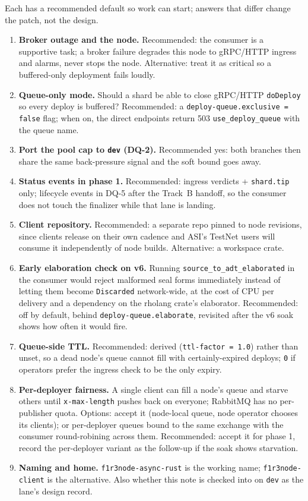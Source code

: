 \documentclass[11pt]{article}
\newcommand{\code}[1]{\texttt{#1}}
\newcommand{\dev}{\code{dev}}
\begin{document}
Each has a recommended default so work can start; answers that differ change the
patch, not the design.
\begin{enumerate}[leftmargin=2em]
  \item \textbf{Broker outage and the node.} Recommended: the consumer is a
    supportive task; a broker failure degrades this node to gRPC/HTTP ingress and
    alarms, never stops the node. Alternative: treat it as critical so a
    buffered-only deployment fails loudly.
  \item \textbf{Queue-only mode.} Should a shard be able to close gRPC/HTTP
    \code{doDeploy} so every deploy is buffered? Recommended: a
    \code{deploy-queue.exclusive = false} flag; when on, the direct endpoints return
    503 \code{use\_deploy\_queue} with the queue name.
  \item \textbf{Port the pool cap to \dev{} (DQ-2).} Recommended yes: both branches
    then share the same back-pressure signal and the soft bound goes away.
  \item \textbf{Status events in phase 1.} Recommended: ingress verdicts +
    \code{shard.tip} only; lifecycle events in DQ-5 after the Track~B handoff, so the
    consumer does not touch the finalizer while that lane is landing.
  \item \textbf{Client repository.} Recommended: a separate
     repo pinned to node revisions, since
    clients release on their own cadence and ASI's TestNet users will consume it
    independently of node builds. Alternative: a  workspace crate.
  \item \textbf{Early elaboration check on v6.} Running
    \code{source\_to\_adt\_elaborated} in the consumer would reject malformed seal
    forms immediately instead of letting them become \code{Discarded} network-wide,
    at the cost of CPU per delivery and a dependency on the rholang crate's
    elaborator. Recommended: off by default, behind \code{deploy-queue.elaborate},
    revisited after the v6 soak shows how often it would fire.
  \item \textbf{Queue-side TTL.} Recommended: derived (\code{ttl-factor = 1.0})
    rather than unset, so a dead node's queue cannot fill with certainly-expired
    deploys; \code{0} if operators prefer the ingress check to be the only expiry.
  \item \textbf{Per-deployer fairness.} A single client can fill a node's queue and
    starve others until \code{x-max-length} pushes back on everyone; RabbitMQ has no
    per-publisher quota. Options: accept it (node-local queue, node operator chooses
    its clients); or per-deployer queues bound to the same exchange with the
    consumer round-robining across them. Recommended: accept it for phase 1, record
    the per-deployer variant as the follow-up if the soak shows starvation.
  \item \textbf{Naming and home.} \code{f1r3node-async-rust} is the working name;
    \code{f1r3node-client} is the alternative. Also whether this note is checked into
     on \dev{} as the lane's design record.
\end{enumerate}
\end{document}
